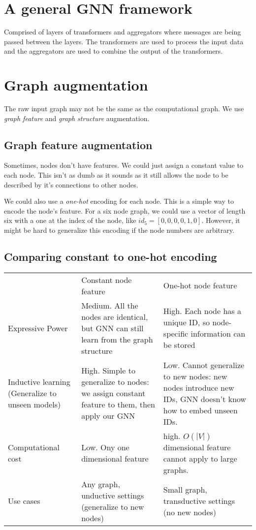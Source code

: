 \documentclass{article}
\begin{document}
 

\section{A general GNN framework}

Comprised of layers of transformers and aggregators where messages are being passed between the layers. The transformers are used to process the input data and the aggregators are used to combine the output of the transformers.

\section{Graph augmentation}

The raw input graph may not be the same as the computational graph. We use \emph{graph feature} and \emph{graph structure} augmentation.

\subsection{Graph feature augmentation}

Sometimes, nodes don't have features. We could just assign a constant value to each node. This isn't as dumb as it sounds as it still allows the node to be described by it's connections to other nodes.

We could also use a \emph{one-hot} encoding for each node. This is a simple way to encode the node's feature. For a six node graph, we could use a vector of length six with a one at the index of the node, like $\textit{id}_5 = [0,0,0,0,1,0]$. However, it might be hard to generalize this encoding if the node numbers are arbitrary.

\subsection*{Comparing constant to one-hot encoding}
\begin{tabularx}{\textwidth}{XXX}
    \hline \hline 
     & Constant node feature & One-hot node feature \\
    Expressive Power & Medium. All the nodes are identical, but GNN can still learn from the graph structure & High. Each node has a unique ID, so node-specific information can be stored \\
    Inductive learning (Generalize to unseen models) & High. Simple to generalize to nodes: we assign constant feature to them, then apply our GNN & Low. Cannot generalize to new nodes: new nodes introduce new IDs, GNN doesn't know how to embed unseen IDs. \\
    Computational cost & Low. Ony one dimensional feature & high. $O(|V|)$ dimensional feature cannot apply to large graphs. \\
    Use cases & Any graph, unductive settings (generalize to new nodes) & Small graph, transductive settings (no new nodes) \\
    \hline \hline 
\end{tabularx}
\end{document}
